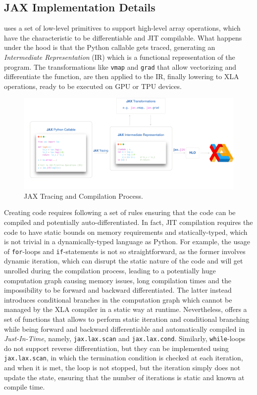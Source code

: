 \subsection{JAX Implementation Details}

\jax uses a set of low-level primitives to support high-level array operations, which have the characteristic to be differentiable and \ac{JIT} compilable. What happens under the hood is that the Python callable gets traced, generating an \textit{Intermediate Representation} (\jax IR) which is a functional representation of the program. The \jax transformations like \texttt{vmap} and \texttt{grad} that allow vectorizing and differentiate the function, are then applied to the \jax IR, finally lowering to \ac{XLA} operations, ready to be executed on \ac{GPU} or \ac{TPU} devices.


\begin{figure}
    \centering
    \caption{JAX Tracing and Compilation Process.}
    \includegraphics[width=\textwidth]{Images/jax_compute_graph_short.png}
\end{figure}

Creating \jax code requires following a set of rules ensuring that the code can be compiled and potentially auto-differentiated. In fact, \ac{JIT} compilation requires the code to have static bounds on memory requirements and statically-typed, which is not trivial in a dynamically-typed language as Python.
For example, the usage of \texttt{for}-loops and \texttt{if}-statements is not so straightforward, as the former involves dynamic iteration, which can disrupt the static nature of the code and will get unrolled during the compilation process, leading to a potentially huge computation graph causing memory issues, long compilation times and the impossibility to be forward and backward differentiated. The latter instead introduces conditional branches in the computation graph which cannot be managed by the \ac{XLA} compiler in a static way at runtime. Nevertheless, \jax offers a set of functions that allows to perform static iteration and conditional branching while being forward and backward differentiable and automatically compiled in \textit{Just-In-Time}, namely, \texttt{jax.lax.scan} and \texttt{jax.lax.cond}. Similarly, \texttt{while}-loops do not support reverse differentiation, but they can be implemented using \texttt{jax.lax.scan}, in which the termination condition is checked at each iteration, and when it is met, the loop is not stopped, but the iteration simply does not update the state, ensuring that the number of iterations is static and known at compile time.

